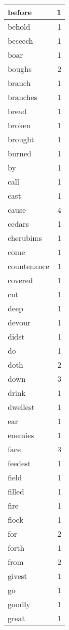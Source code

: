 \begin{center}
\begin{longtable}{l|r}
before & 1 \\ \hline
behold & 1 \\ \hline
beseech & 1 \\ \hline
boar & 1 \\ \hline
boughs & 2 \\ \hline
branch & 1 \\ \hline
branches & 1 \\ \hline
bread & 1 \\ \hline
broken & 1 \\ \hline
brought & 1 \\ \hline
burned & 1 \\ \hline
by & 1 \\ \hline
call & 1 \\ \hline
cast & 1 \\ \hline
cause & 4 \\ \hline
cedars & 1 \\ \hline
cherubims & 1 \\ \hline
come & 1 \\ \hline
countenance & 1 \\ \hline
covered & 1 \\ \hline
cut & 1 \\ \hline
deep & 1 \\ \hline
devour & 1 \\ \hline
didst & 1 \\ \hline
do & 1 \\ \hline
doth & 2 \\ \hline
down & 3 \\ \hline
drink & 1 \\ \hline
dwellest & 1 \\ \hline
ear & 1 \\ \hline
enemies & 1 \\ \hline
face & 3 \\ \hline
feedest & 1 \\ \hline
field & 1 \\ \hline
filled & 1 \\ \hline
fire & 1 \\ \hline
flock & 1 \\ \hline
for & 2 \\ \hline
forth & 1 \\ \hline
from & 2 \\ \hline
givest & 1 \\ \hline
go & 1 \\ \hline
goodly & 1 \\ \hline
great & 1 \\ \hline

\end{longtable}
\end{center}
